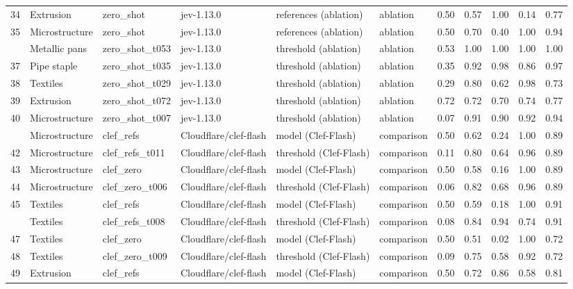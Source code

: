 \begin{table}
\begin{tabular}[t]{rlllllrrrrr}
34 & Extrusion & zero\_shot & jev-1.13.0 & references (ablation) & ablation & 0.50 & 0.57 & 1.00 & 0.14 & 0.77\\
35 & Microstructure & zero\_shot & jev-1.13.0 & references (ablation) & ablation & 0.50 & 0.70 & 0.40 & 1.00 & 0.94\\
\addlinespace
36 & Metallic pans & zero\_shot\_t053 & jev-1.13.0 & threshold (ablation) & ablation & 0.53 & 1.00 & 1.00 & 1.00 & 1.00\\
37 & Pipe staple & zero\_shot\_t035 & jev-1.13.0 & threshold (ablation) & ablation & 0.35 & 0.92 & 0.98 & 0.86 & 0.97\\
38 & Textiles & zero\_shot\_t029 & jev-1.13.0 & threshold (ablation) & ablation & 0.29 & 0.80 & 0.62 & 0.98 & 0.73\\
39 & Extrusion & zero\_shot\_t072 & jev-1.13.0 & threshold (ablation) & ablation & 0.72 & 0.72 & 0.70 & 0.74 & 0.77\\
40 & Microstructure & zero\_shot\_t007 & jev-1.13.0 & threshold (ablation) & ablation & 0.07 & 0.91 & 0.90 & 0.92 & 0.94\\
\addlinespace
41 & Microstructure & clef\_refs & Cloudflare/clef-flash & model (Clef-Flash) & comparison & 0.50 & 0.62 & 0.24 & 1.00 & 0.89\\
42 & Microstructure & clef\_refs\_t011 & Cloudflare/clef-flash & threshold (Clef-Flash) & comparison & 0.11 & 0.80 & 0.64 & 0.96 & 0.89\\
43 & Microstructure & clef\_zero & Cloudflare/clef-flash & model (Clef-Flash) & comparison & 0.50 & 0.58 & 0.16 & 1.00 & 0.89\\
44 & Microstructure & clef\_zero\_t006 & Cloudflare/clef-flash & threshold (Clef-Flash) & comparison & 0.06 & 0.82 & 0.68 & 0.96 & 0.89\\
45 & Textiles & clef\_refs & Cloudflare/clef-flash & model (Clef-Flash) & comparison & 0.50 & 0.59 & 0.18 & 1.00 & 0.91\\
\addlinespace
46 & Textiles & clef\_refs\_t008 & Cloudflare/clef-flash & threshold (Clef-Flash) & comparison & 0.08 & 0.84 & 0.94 & 0.74 & 0.91\\
47 & Textiles & clef\_zero & Cloudflare/clef-flash & model (Clef-Flash) & comparison & 0.50 & 0.51 & 0.02 & 1.00 & 0.72\\
48 & Textiles & clef\_zero\_t009 & Cloudflare/clef-flash & threshold (Clef-Flash) & comparison & 0.09 & 0.75 & 0.58 & 0.92 & 0.72\\
49 & Extrusion & clef\_refs & Cloudflare/clef-flash & model (Clef-Flash) & comparison & 0.50 & 0.72 & 0.86 & 0.58 & 0.81\\

\end{tabular}
\end{table}
